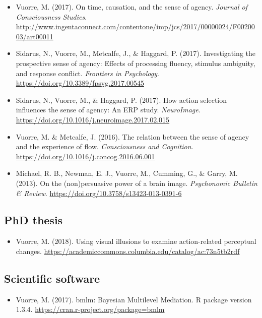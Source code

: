 \documentclass[12pt, a4paper]{article}
\newcommand{\years}[1]{\marginnote{\scriptsize #1}}
\begin{document}
\begin{itemize}
\item Vuorre, M. (2017). On time, causation, and the sense of agency. \emph{Journal of Consciousness Studies}. \url{http://www.ingentaconnect.com/contentone/imp/jcs/2017/00000024/F0020003/art00011}
\item Sidarus, N., Vuorre, M., Metcalfe, J., \& Haggard, P. (2017). Investigating the prospective sense of agency: Effects of processing fluency, stimulus ambiguity, and response conflict. \emph{Frontiers in Psychology}. \url{https://doi.org/10.3389/fpsyg.2017.00545}
\item Sidarus, N., Vuorre, M., \& Haggard, P. (2017). How action selection influences the sense of agency: An ERP study. \emph{NeuroImage}. \url{https://doi.org/10.1016/j.neuroimage.2017.02.015}
\item \years{2016} Vuorre, M. \& Metcalfe, J. (2016). The relation between the sense of agency and the experience of flow. \emph{Consciousness and Cognition}. \url{https://doi.org/10.1016/j.concog.2016.06.001}
\item \years{2013} Michael, R. B., Newman, E. J., Vuorre, M., Cumming, G., \& Garry, M. (2013). On the (non)persuasive power of a brain image. \emph{Psychonomic Bulletin \& Review}. \url{https://doi.org/10.3758/s13423-013-0391-6}
\end{itemize}

\subsection*{PhD thesis}
\begin{itemize}
\item \years{2018} Vuorre, M. (2018). Using visual illusions to examine action-related perceptual changes. \url{https://academiccommons.columbia.edu/catalog/ac:73n5tb2rdf}
\end{itemize}

\subsection*{Scientific software}
\begin{itemize}
\item \years{2017} Vuorre, M. (2017). bmlm: Bayesian Multilevel Mediation. R package version 1.3.4. \url{https://cran.r-project.org/package=bmlm}
\end{itemize}
\end{document}
